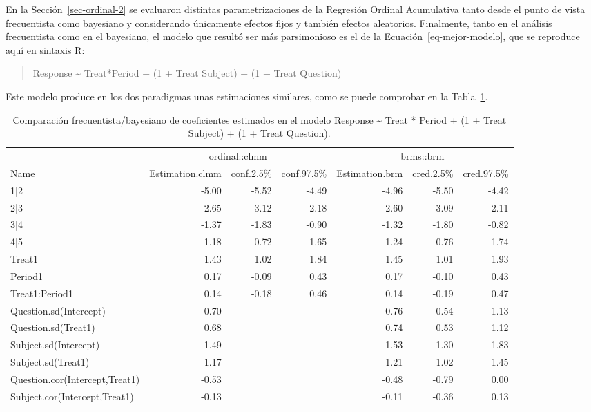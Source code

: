 \documentclass[
  12pt,
  a4paper,
  extrafontsizes,
  onecolumn,
  openright,
  table]{memoir}
\begin{document}
\normalsize

En la Sección~\ref{sec-ordinal-2} se evaluaron distintas
parametrizaciones de la Regresión Ordinal Acumulativa tanto desde el
punto de vista frecuentista como bayesiano y considerando únicamente
efectos fijos y también efectos aleatorios. Finalmente, tanto en el
análisis frecuentista como en el bayesiano, el modelo que resultó ser
más parsimonioso es el de la Ecuación~\ref{eq-mejor-modelo}, que se
reproduce aquí en sintaxis R:

\small

\begin{quote}
Response \textasciitilde{} Treat*Period + (1 + Treat \textbar{} Subject)
+ (1 + Treat \textbar{} Question) \normalsize
\end{quote}

Este modelo produce en los dos paradigmas unas estimaciones similares,
como se puede comprobar en la Tabla~\ref{tbl-model-comp}.

\tiny

\hypertarget{tbl-model-comp}{}
\begin{longtable}{lrrrrrr}
\caption{\label{tbl-model-comp}Comparación frecuentista/bayesiano de coeficientes estimados en el
modelo Response \textasciitilde{} Treat * Period + (1 + Treat \textbar{}
Subject) + (1 + Treat \textbar{} Question). }\tabularnewline

\toprule
 & \multicolumn{3}{c}{ordinal::clmm} & \multicolumn{3}{c}{brms::brm} \\ 
\cmidrule(lr){2-4} \cmidrule(lr){5-7}
Name & Estimation.clmm & conf.2.5\% & conf.97.5\% & Estimation.brm & cred.2.5\% & cred.97.5\% \\ 
\midrule
1|2 & -5.00 & -5.52 & -4.49 & -4.96 & -5.50 & -4.42 \\ 
2|3 & -2.65 & -3.12 & -2.18 & -2.60 & -3.09 & -2.11 \\ 
3|4 & -1.37 & -1.83 & -0.90 & -1.32 & -1.80 & -0.82 \\ 
4|5 & 1.18 & 0.72 & 1.65 & 1.24 & 0.76 & 1.74 \\ 
Treat1 & 1.43 & 1.02 & 1.84 & 1.45 & 1.01 & 1.93 \\ 
Period1 & 0.17 & -0.09 & 0.43 & 0.17 & -0.10 & 0.43 \\ 
Treat1:Period1 & 0.14 & -0.18 & 0.46 & 0.14 & -0.19 & 0.47 \\ 
Question.sd(Intercept) & 0.70 &  &  & 0.76 & 0.54 & 1.13 \\ 
Question.sd(Treat1) & 0.68 &  &  & 0.74 & 0.53 & 1.12 \\ 
Subject.sd(Intercept) & 1.49 &  &  & 1.53 & 1.30 & 1.83 \\ 
Subject.sd(Treat1) & 1.17 &  &  & 1.21 & 1.02 & 1.45 \\ 
Question.cor(Intercept,Treat1) & -0.53 &  &  & -0.48 & -0.79 & 0.00 \\ 
Subject.cor(Intercept,Treat1) & -0.13 &  &  & -0.11 & -0.36 & 0.13 \\ 
\bottomrule
\end{longtable}
\end{document}
